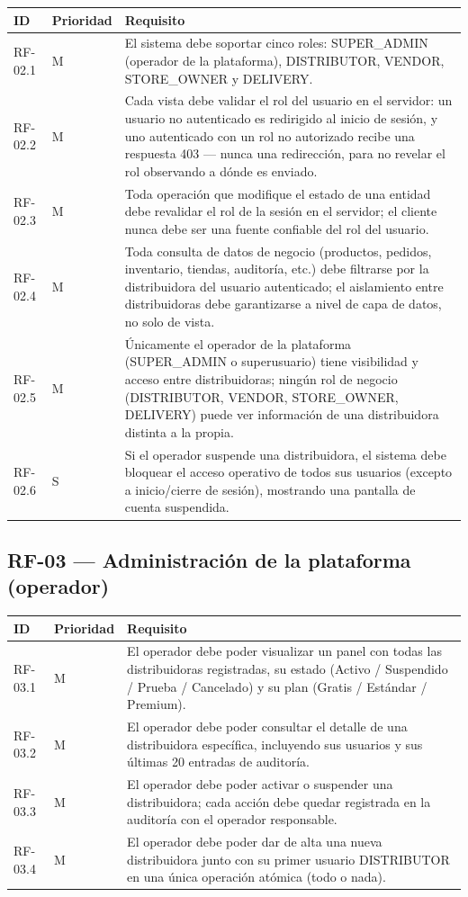\documentclass[12pt,a4paper]{report}
\begin{document}
\begin{longtable}{|p{2cm}|p{2cm}|p{10cm}|}
\hline
\textbf{ID} & \textbf{Prioridad} & \textbf{Requisito} \\ \hline
RF-02.1 & M & El sistema debe soportar cinco roles: SUPER\_ADMIN (operador de la plataforma), DISTRIBUTOR, VENDOR, STORE\_OWNER y DELIVERY. \\ \hline
RF-02.2 & M & Cada vista debe validar el rol del usuario en el servidor: un usuario no autenticado es redirigido al inicio de sesión, y uno autenticado con un rol no autorizado recibe una respuesta 403 — nunca una redirección, para no revelar el rol observando a dónde es enviado. \\ \hline
RF-02.3 & M & Toda operación que modifique el estado de una entidad debe revalidar el rol de la sesión en el servidor; el cliente nunca debe ser una fuente confiable del rol del usuario. \\ \hline
RF-02.4 & M & Toda consulta de datos de negocio (productos, pedidos, inventario, tiendas, auditoría, etc.) debe filtrarse por la distribuidora del usuario autenticado; el aislamiento entre distribuidoras debe garantizarse a nivel de capa de datos, no solo de vista. \\ \hline
RF-02.5 & M & Únicamente el operador de la plataforma (SUPER\_ADMIN o superusuario) tiene visibilidad y acceso entre distribuidoras; ningún rol de negocio (DISTRIBUTOR, VENDOR, STORE\_OWNER, DELIVERY) puede ver información de una distribuidora distinta a la propia. \\ \hline
RF-02.6 & S & Si el operador suspende una distribuidora, el sistema debe bloquear el acceso operativo de todos sus usuarios (excepto a inicio/cierre de sesión), mostrando una pantalla de cuenta suspendida. \\ \hline
\end{longtable}

\subsection{RF-03 --- Administración de la plataforma (operador)}

\begin{longtable}{|p{2cm}|p{2cm}|p{10cm}|}
\hline
\textbf{ID} & \textbf{Prioridad} & \textbf{Requisito} \\ \hline
RF-03.1 & M & El operador debe poder visualizar un panel con todas las distribuidoras registradas, su estado (Activo / Suspendido / Prueba / Cancelado) y su plan (Gratis / Estándar / Premium). \\ \hline
RF-03.2 & M & El operador debe poder consultar el detalle de una distribuidora específica, incluyendo sus usuarios y sus últimas 20 entradas de auditoría. \\ \hline
RF-03.3 & M & El operador debe poder activar o suspender una distribuidora; cada acción debe quedar registrada en la auditoría con el operador responsable. \\ \hline
RF-03.4 & M & El operador debe poder dar de alta una nueva distribuidora junto con su primer usuario DISTRIBUTOR en una única operación atómica (todo o nada). \\ \hline
\end{longtable}
\end{document}

